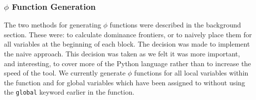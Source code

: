 \documentclass[12pt, titlepage]{article}
\begin{document}
\subsubsection{$\phi$ Function Generation}
The two methods for generating $\phi$ functions were described in the background section. These were: to calculate dominance frontiers, or to naively place them for all variables at the beginning of each block. The decision was made to implement the naive approach. This decision was taken as we felt it was more important, and interesting, to cover more of the Python language rather than to increase the speed of the tool. We currently generate $\phi$ functions for all local variables within the function and for global variables which have been assigned to without using the \texttt{global} keyword earlier in the function.
\end{document}
